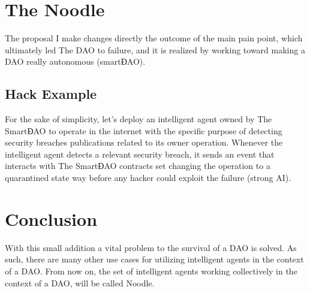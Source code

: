\documentclass[twoside,twocolumn]{article}
\begin{document}
\section{The Noodle}

The proposal I make changes directly the outcome of the main pain point, which ultimately led The DAO to failure, and it is realized by working toward making a DAO really autonomous (smartƉAO).

\subsection{Hack Example}

For the sake of simplicity, let’s deploy an intelligent agent owned by The SmartƉAO to operate in the internet with the specific purpose of detecting security breaches publications related to its owner operation.
Whenever the intelligent agent detects a relevant security breach, it sends an event that interacts with The SmartƉAO contracts set changing the operation to a quarantined state way before any hacker could exploit the failure (strong AI\cite{kurzweil2000age}).

\section{Conclusion}

With this small addition a vital problem to the survival of a DAO is solved. As such, there are many other use cases for utilizing intelligent agents in the context of a DAO. From now on, the set of intelligent agents working collectively in the context of a DAO, will be called Noodle.

\end{document}
